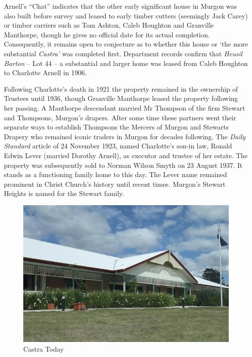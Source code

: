 Arnell's ``Chat'' indicates that the other early significant house in Murgon was also built before survey and leased to early timber cutters (seemingly Jack Carey) or timber carriers such as Tom Ashton, Caleb Houghton and Granville Manthorpe, though he gives no official date for its actual completion. Consequently, it remains open to conjecture as to whether this house or `the more substantial \emph{Castra'} was completed first. Department records confirm that \emph{Heusil Barton} -- Lot 44 -- a substantial and larger home was leased from Caleb Houghton to Charlotte Arnell in 1906.



Following Charlotte's death in 1921 the property remained in the ownership of Trustees until 1936, though Granville Manthorpe leased the property following her passing. A Manthorpe descendant married Mr Thompson of the firm Stewart and Thompsons, Murgon's drapers. After some time these partners went their separate ways to establish Thompsons the Mercers of Murgon and Stewarts Drapery who remained iconic traders in Murgon for decades following. The \emph{Daily Standard} article of 24 November 1923, named Charlotte's son-in law, Ronald Edwin Lever (married Dorothy Arnell), as executor and trustee of her estate. The property was subsequently sold to Norman Wilson Smyth on 23 August 1937. It stands as a functioning family home to this day. The Lever name remained prominent in Christ Church's history until recent times. Murgon's Stewart Heights is named for the Stewart family.









\begin{figure}
\begin{center}
\includegraphics[width=1.\linewidth,center]{../images/castraToday.png}
\caption{Castra Today}
\end{center}
\end{figure}




